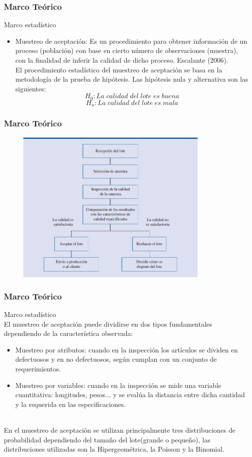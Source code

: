 \documentclass[10pt]{beamer}
\begin{document}
\begin{frame}
\frametitle{Marco Teórico}
\begin{block}{Marco estadístico}
\begin{itemize}
\justifying
\item Muestreo de aceptación: Es un procedimiento para obtener información de un proceso (población) con base en cierto número de observaciones (muestra), con la finalidad de inferir la calidad de dicho proceso. Escalante (2006).
~\\El procedimiento estadístico del muestreo de aceptación se basa en la metodología de la prueba de hipótesis. Las hipótesis nula y alternativa son las siguientes:
$$H_0:La \; calidad \; del \; lote \; es \; buena$$
$$H_a:La \; calidad \; del \; lote \; es \; mala$$
\end{itemize}
\end{block}
\end{frame}

\begin{frame}
\frametitle{Marco Teórico}
\begin{figure}[!h]
        \includegraphics[width=9.5cm]{IMAGENES/MA.png}
        \label{figura1}
\end{figure}
\end{frame}

\begin{frame}
\frametitle{Marco Teórico}
\begin{block}{Marco estadístico}
~\\El muestreo de aceptación puede dividirse en dos tipos fundamentales dependiendo de la característica observada:
\begin{itemize}
\justifying
\item Muestreo por atributos: cuando en la inspección los artículos se dividen en defectuosos y en no defectuosos, según cumplan con un conjunto de requerimientos.
\item Muestreo por variables: cuando en la inspección se mide una variable cuantitativa: longitudes, pesos... y se evalúa la distancia entre dicha cantidad y la requerida en las especificaciones.
\end{itemize}
~\\En el muestreo de aceptación se utilizan principalmente tres distribuciones de probabilidad dependiendo del tamaño del lote(grande o pequeño), las distribuciones utilizadas son la Hipergeométrica, la Poisson y la Binomial.
\end{block}
\end{frame}
\end{document}
